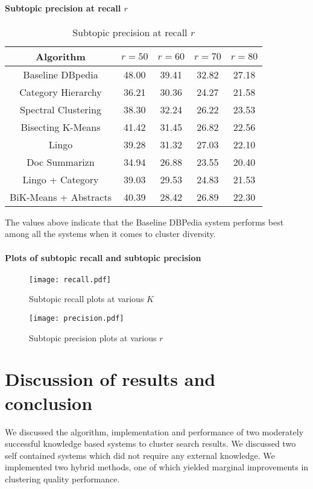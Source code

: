 \documentclass[a4paper,12pt]{report}
\begin{document}
\subsubsection{Subtopic precision at recall $r$}

\begin{table}[h]
\centering
\begin{tabular} {|c | c | c | c|c|}
  \hline
  Algorithm & $r = 50$ & $r = 60$  & $r = 70$ & $r = 80$ \\
  \hline
  Baseline DBpedia & 48.00 & 39.41 & 32.82 & 27.18 \\
  Category Hierarchy & 36.21 & 30.36 & 24.27 & 21.58 \\
  Spectral Clustering & 38.30 & 32.24 & 26.22 & 23.53 \\
  \hline
  Bisecting K-Means & 41.42 & 31.45 & 26.82 & 22.56 \\
  Lingo & 39.28 & 31.32 & 27.03 & 22.10 \\
  Doc Summarizn & 34.94 & 26.88 & 23.55 & 20.40 \\
  \hline
  Lingo + Category & 39.03 & 29.53 & 24.83 & 21.53 \\
  BiK-Means + Abstracts & 40.39 & 28.42 & 26.89 & 22.30 \\
  \hline
\end{tabular}
\caption{Subtopic precision at recall $r$}
\end{table}
The values above indicate that the Baseline DBPedia system performs
best among all the systems when it comes to cluster diversity.
\newpage
\subsubsection{Plots of subtopic recall and subtopic precision}

\begin{figure}[h]
  \centering
  \texttt{[image: recall.pdf]}
  \caption{Subtopic recall plots at various $K$}
  \label{fig:recall}
\end{figure}

\begin{figure}[h]
  \centering
  \texttt{[image: precision.pdf]}
  \caption{Subtopic precision plots at various $r$}
  \label{fig:recall}
\end{figure}


\chapter {Discussion of results and conclusion}
We discussed the algorithm, implementation and performance of two
moderately successful knowledge based systems to cluster search
results. We discussed two self contained systems which did not require
any external knowledge. We implemented two hybrid methods, one of
which yielded marginal improvements in clustering quality performance.
\end{document}
